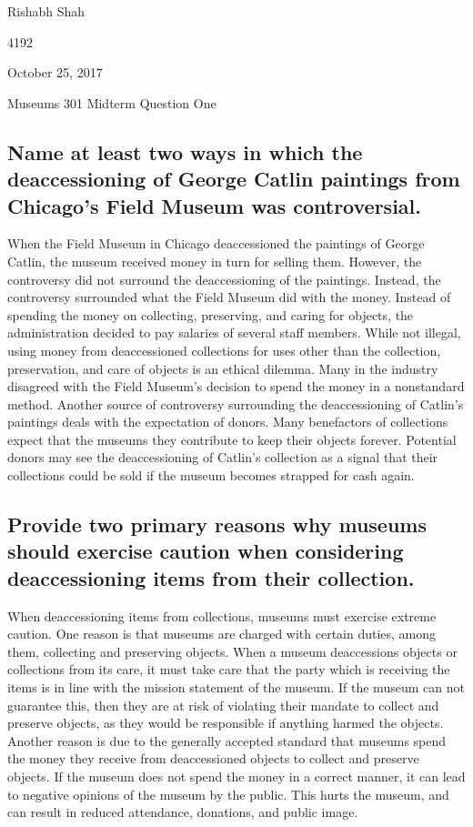 \documentclass[11pt]{article}
\begin{document}
\singlespacing
{\Large\noindent Rishabh Shah

 4192

\noindent October 25, 2017

\noindent Museums 301 Midterm Question One}

\singlespacing
\subsection*{Name at least two ways in which the deaccessioning of George Catlin paintings from Chicago’s Field Museum was controversial.}

\doublespacing
When the Field Museum in Chicago deaccessioned the paintings of George Catlin, the museum received money in turn for selling them. However, the controversy did not surround the deaccessioning of the paintings. Instead, the controversy surrounded what the Field Museum did with the money. Instead of spending the money on collecting, preserving, and caring for objects, the administration decided to pay salaries of several staff members. While not illegal, using money from deaccessioned collections for uses other than the collection, preservation, and care of objects is an ethical dilemma. Many in the industry disagreed with the Field Museum's decision to spend the money in a nonstandard method. Another source of controversy surrounding the deaccessioning of Catlin's paintings deals with the expectation of donors. Many benefactors of collections expect that the museums they contribute to keep their objects forever. Potential donors may see the deaccessioning of Catlin's collection as a signal that their collections could be sold if the museum becomes strapped for cash again.

\singlespacing
\subsection*{Provide two primary reasons why museums should exercise caution when considering deaccessioning items from their collection.}

\doublespacing
When deaccessioning items from collections, museums must exercise extreme caution. One reason is that museums are charged with certain duties, among them, collecting and preserving objects. When a museum deaccessions objects or collections from its care, it must take care that the party which is receiving the items is in line with the mission statement of the museum. If the museum can not guarantee this, then they are at risk of violating their mandate to collect and preserve objects, as they would be responsible if anything harmed the objects. Another reason is due to the generally accepted standard that museums spend the money they receive from deaccessioned objects to collect and preserve objects. If the museum does not spend the money in a correct manner, it can lead to negative opinions of the museum by the public. This hurts the museum, and can result in reduced attendance, donations, and public image.
\end{document}
